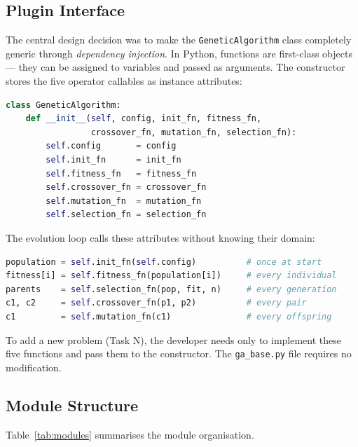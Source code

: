 \documentclass[12pt,a4paper]{article}
\begin{document}
\subsection{Plugin Interface}

The central design decision was to make the \texttt{GeneticAlgorithm} class completely generic through \emph{dependency injection}. In Python, functions are first-class objects — they can be assigned to variables and passed as arguments. The constructor stores the five operator callables as instance attributes:

\begin{lstlisting}[language=Python, caption={GeneticAlgorithm constructor (ga\_base.py)}]
class GeneticAlgorithm:
    def __init__(self, config, init_fn, fitness_fn,
                 crossover_fn, mutation_fn, selection_fn):
        self.config       = config
        self.init_fn      = init_fn
        self.fitness_fn   = fitness_fn
        self.crossover_fn = crossover_fn
        self.mutation_fn  = mutation_fn
        self.selection_fn = selection_fn
\end{lstlisting}

The evolution loop calls these attributes without knowing their domain:

\begin{lstlisting}[language=Python, caption={Generic calls inside run() and \_breed()}]
population = self.init_fn(self.config)          # once at start
fitness[i] = self.fitness_fn(population[i])     # every individual
parents    = self.selection_fn(pop, fit, n)     # every generation
c1, c2     = self.crossover_fn(p1, p2)          # every pair
c1         = self.mutation_fn(c1)               # every offspring
\end{lstlisting}

To add a new problem (Task N), the developer needs only to implement these five functions and pass them to the constructor. The \texttt{ga\_base.py} file requires no modification.

\subsection{Module Structure}

Table~\ref{tab:modules} summarises the module organisation.
\end{document}
